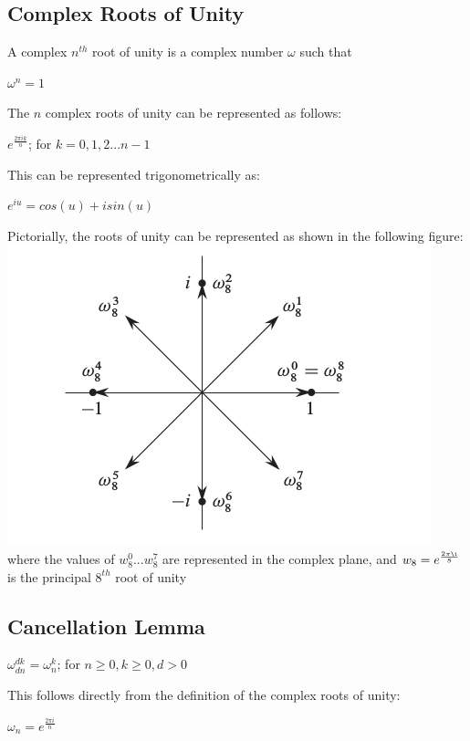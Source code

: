 \documentclass{article}
\begin{document}
\subsection{Complex Roots of Unity}
A complex $n^{th}$ root of unity is a complex number $\omega$ such that \\
\begin{center}
$\omega^{n}=1$ \\
\end{center}
The $n$ complex roots of unity can be represented as follows:
\begin{center}
$e^{\frac{2\pi ik}{n}}$; for $k=0,1,2...n-1$
\end{center}
This can be represented trigonometrically as:
\begin{center}
$e^{iu}=cos(u)+isin(u)$
\end{center}
Pictorially, the roots of unity can be represented as shown in the following figure: \\
\includegraphics[scale=0.5]{roots} \\
where the values of $w_{8}^{0}...w_{8}^{7}$ are represented in the complex plane, and $w_{8}=e^{\frac{2\pi\i}{8}}$ is the principal $8^{th}$ root of unity

\subsection{Cancellation Lemma}
\begin{center}
$\omega_{dn}^{dk}=\omega_{n}^{k}$; for $n \geq 0, k \geq 0, d>0$ \\
\end{center}
This follows directly from the definition of the complex roots of unity:
\begin{center}
$\omega_{n}=e^{\frac{2\pi i}{n}}$
\end{center} 
\end{document}
